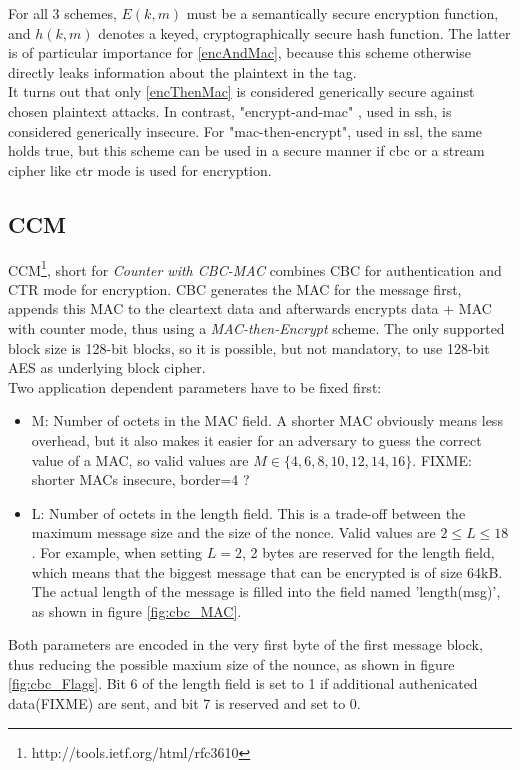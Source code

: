 For all 3 schemes, $E(k, m)$ must be a semantically secure encryption function, and $h(k, m)$ denotes a keyed, cryptographically secure hash function.
The latter is of particular importance for \ref{encAndMac}, because this scheme otherwise directly leaks information about the plaintext in the tag. 
\\
It turns out that only \ref{encThenMac} is considered generically secure against chosen plaintext attacks.
In contrast, "encrypt-and-mac" \cite{sshBellare}, used in \gls{ssh}, is considered generically
insecure. For "mac-then-encrypt", used in \gls{ssl}, the same holds true, but this scheme can be used in a secure manner if \gls{cbc} or a stream cipher like 
\gls{ctr} mode is used for encryption. 

\subsection{CCM}

CCM\footnote{http://tools.ietf.org/html/rfc3610}, short for \textit{Counter with CBC-MAC} combines CBC for authentication and CTR mode for encryption.
CBC generates the MAC for the message first, appends this MAC to the cleartext data and afterwards encrypts data + MAC with counter mode, thus using a
\textit{MAC-then-Encrypt} scheme. The only
supported block size is 128-bit blocks, so it is possible, but not mandatory, to use 128-bit AES as underlying block cipher.
\\
Two application dependent parameters have to be fixed first: 
\begin{itemize}
 \item M: Number of octets in the MAC field. A shorter MAC obviously means less overhead, but it also makes it easier for an adversary to guess the correct
 value of a MAC, so valid values are $M \in \{4, 6, 8, 10, 12, 14, 16\}$. FIXME: shorter MACs insecure, border=4 ? 
 \item L: Number of octets in the length field. This is a trade-off between the maximum message size and the size of the nonce. Valid values are $2 \leq L \leq 18$.
 For example, when setting $L = 2$, 2 bytes are reserved for the length field, which means that the biggest message that can be encrypted is of size 64kB. The actual
 length of the message is filled into the field named 'length(msg)', as shown in figure \ref{fig:cbc_MAC}.
\end{itemize}

Both parameters are encoded in the very first byte of the first message block, thus reducing the possible maxium size of the nounce, as shown in figure \ref{fig:cbc_Flags}.
Bit 6 of the length field is set to 1 if additional authenicated data(FIXME) are sent, and bit 7 is reserved and set to 0.


